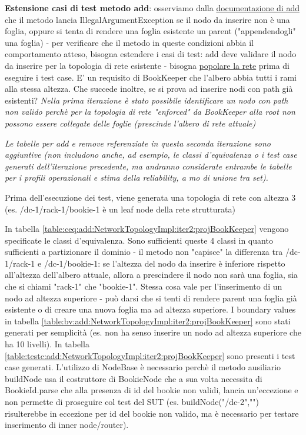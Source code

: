\documentclass[10pt, a4paper]{article}
\newcommand{\gettablelabel}[5]{table:#1:#2:#3:iter#4:proj#5}
\def\bookkeeper{BookKeeper}
\begin{document}
	\textbf{Estensione casi di test metodo add}: osserviamo dalla 
	\href{https://bookkeeper.apache.org/docs/latest/api/javadoc/org/apache/bookkeeper/net/NetworkTopologyImpl.html#add(org.apache.bookkeeper.net.Node)}
	{documentazione di add}
	che il metodo lancia IllegalArgumentException se il nodo da inserire non è una foglia, oppure si tenta
	di rendere una foglia esistente un parent ("appendendogli" una foglia) - per verificare che il metodo
	in queste condizioni abbia il comportamento atteso, bisogna estendere i casi di test: add deve validare il 
	nodo da inserire per la topologia di rete esistente - bisogna \underline{popolare la rete} prima di eseguire i test case. 
	E' un requisito di \bookkeeper\; che l'albero abbia tutti i rami alla stessa altezza.
	Che succede inoltre, se si prova ad inserire nodi con path già esistenti?
	\textit{Nella prima iterazione è stato possibile identificare un nodo con path non valido perchè per la topologia
	di rete "enforced" da \bookkeeper\; alla root non possono essere collegate delle foglie (prescinde l'albero
	di rete attuale)}
	
	\textit{Le tabelle per add e remove referenziate in questa seconda iterazione sono aggiuntive (non includono anche,
	ad esempio, le classi d'equivalenza o i test case generati dell'iterazione precedente, ma andranno considerate
	entrambe le tabelle per i profili operazionali e stima della reliability, a mo di unione tra set).}
	
	Prima dell'esecuzione dei test, viene generata una topologia di rete con altezza 3 (es. /dc-1/rack-1/bookie-1 
	è un leaf node della rete strutturata)
	
	In tabella \ref{\gettablelabel{ceq}{add}{NetworkTopologyImpl}{2}{\bookkeeper}} vengono specificate le
	classi d'equivalenza. Sono sufficienti queste 4 classi in quanto sufficienti a partizionare il dominio -
	il metodo non "capisce" la differenza tra /dc-1/rack-1 e /dc-1/bookie-1: se l'altezza del nodo da inserire
	è inferiore rispetto all'altezza dell'albero attuale, allora a prescindere il nodo non sarà una foglia, sia
	che si chiami "rack-1" che "bookie-1". Stessa cosa vale per l'inserimento di un nodo ad altezza superiore -
	può darsi che si tenti di rendere parent una foglia già esistente o di creare una nuova foglia ma ad altezza
	superiore. I boundary values in tabella \ref{\gettablelabel{bv}{add}{NetworkTopologyImpl}{2}{\bookkeeper}}
	sono stati generati per semplicità (es. non ha senso inserire un nodo ad altezza superiore che ha 10 livelli). In tabella \ref{\gettablelabel{testc}{add}{NetworkTopologyImpl}{2}{\bookkeeper}} sono presenti i test
	case generati. L'utilizzo di NodeBase è necessario perchè il metodo ausiliario buildNode usa il costruttore di
	BookieNode che a sua volta necessita di BookieId.parse che alla presenza di id del bookie non validi, lancia
	un'eccezione e non permette di proseguire col test del SUT (es. buildNode("/dc-2","") risulterebbe in eccezione per id del bookie non valido, ma è necessario per testare inserimento di inner node/router).
	
\end{document}
